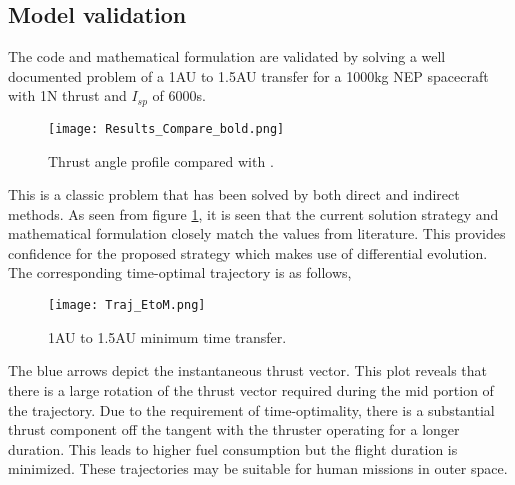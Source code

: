 \subsection{Model validation}
The code and mathematical formulation are validated by solving a well documented problem of a 1AU to 1.5AU transfer for a 1000kg NEP spacecraft with 1N thrust and $I_{sp}$ of 6000s. 
\begin{figure}[H]
	\centering\texttt{[image: Results\_Compare\_bold.png]}
	\caption{Thrust angle profile compared with \cite{kim_continuous_2005}.}
	\label{validate_fig}
\end{figure}
This is a classic problem that has been solved by both direct \citep{arthur._e_applied_1975} and indirect \citep{kim_continuous_2005} methods. As seen from figure \ref{validate_fig}, it is seen that the current solution strategy and mathematical formulation closely match the values from literature. This provides confidence for the proposed strategy which makes use of differential evolution.
The corresponding time-optimal trajectory is as follows,
\begin{figure}[H]
	\centering\texttt{[image: Traj\_EtoM.png]}
	\caption{1AU to 1.5AU minimum time transfer.}
	\label{validate_traj}
\end{figure}
The blue arrows depict the instantaneous thrust vector. This plot reveals that there is a large rotation of the thrust vector required during the mid portion of the trajectory. Due to the requirement of time-optimality, there is a substantial thrust component off the tangent with the thruster operating for a longer duration. This leads to higher fuel consumption but the flight duration is minimized. These trajectories may be suitable for human missions in outer space.
